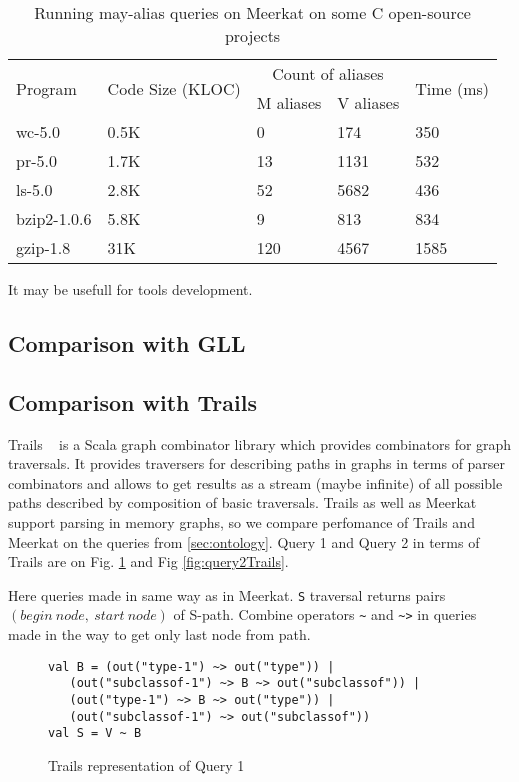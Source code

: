 \begin{table}[t]
\centering
\begin{tabular}{|l|l|ll|l|}
\hline
\multirow{2}{*}{Program} & \multirow{2}{*}{Code Size (KLOC)} & \multicolumn{2}{c|}{Count of aliases} & \multirow{2}{*}{Time (ms)} \\ \cline{3-4}
 &  & \multicolumn{1}{c|}{M aliases} & \multicolumn{1}{c|}{V aliases} &  \\ 
\hline
\hline
wc-5.0      & 0.5K & 0   & 174  & 350 \\
pr-5.0      & 1.7K & 13  & 1131 & 532 \\
ls-5.0      & 2.8K & 52  & 5682 & 436 \\
bzip2-1.0.6 & 5.8K & 9   & 813  & 834 \\
gzip-1.8    & 31K  & 120 & 4567 & 1585\\
\hline
\end{tabular}
\caption{Running may-alias queries on Meerkat on some C open-source projects}
\label{table:staticAnalysis}
\end{table}

It may be usefull for tools development.

\subsection{Comparison with GLL}

\subsection{Comparison with Trails}
Trails ~\cite{ScalaGraphParsing} is a Scala graph combinator library which provides combinators for graph traversals. It provides traversers for describing paths in graphs in terms of parser combinators and allows to get results as a stream (maybe infinite) of all possible paths described by composition of basic traversals. Trails as well as Meerkat support parsing in memory graphs, so we compare perfomance of Trails and Meerkat on the queries from \autoref{sec:ontology}. Query 1 and Query 2 in terms of Trails are on Fig. \ref{fig:query1Trails} and Fig \ref{fig:query2Trails}.

Here queries made in same way as in Meerkat. \lstinline{S} traversal returns pairs $(begin\ node,\ start\ node)$ of S-path. Combine operators \lstinline{~} and \lstinline{~>} in queries made in the way to get only last node from path.


\begin{figure}[h]
\begin{lstlisting}
val B = (out("type-1") ~> out("type")) |
   (out("subclassof-1") ~> B ~> out("subclassof")) |
   (out("type-1") ~> B ~> out("type")) |
   (out("subclassof-1") ~> out("subclassof"))
val S = V ~ B
\end{lstlisting}
\caption{Trails representation of Query 1}
\label{fig:query1Trails}
\end{figure}

